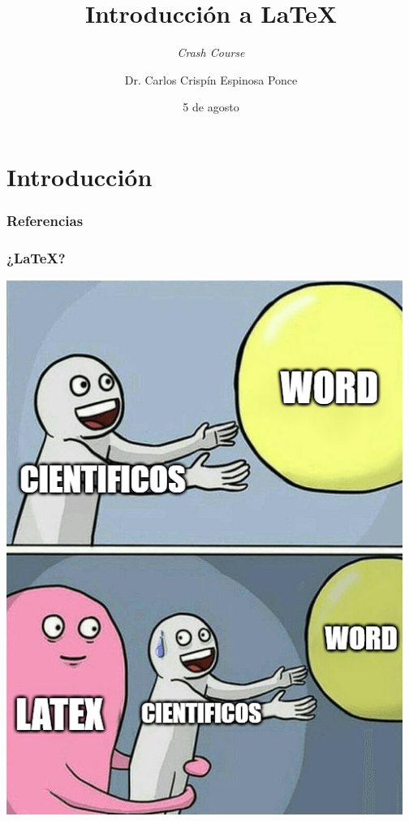 \documentclass[aspectratio=169]{beamer}
\title{Introducción a \LaTeX}
\subtitle{\textit{Crash Course}}
\author[Carlos Espinosa]{Dr. Carlos Crispín Espinosa Ponce}
\institute[FC-UNAM]{Facultad de Ciencias\\Universidad Nacional Autónoma de México}
\date{5 de agosto}
\begin{document}
  \begin{frame}
    \maketitle
  \end{frame}
  \section{Introducción}
    \begin{frame}[allowframebreaks]
      \frametitle{Referencias}
      \printbibliography
      \nocite{*}
    \end{frame}
    \begin{frame}
      \frametitle{¿\LaTeX?}
      \begin{center}
        \includegraphics[scale=0.4]{latex_meme}
      \end{center}
    \end{frame}
\end{document}
